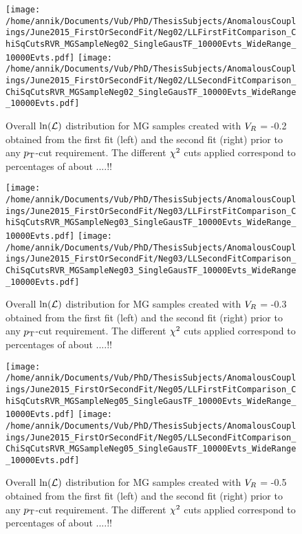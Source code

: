 \begin{figure}[h!t]
 \centering 
 \texttt{[image: /home/annik/Documents/Vub/PhD/ThesisSubjects/AnomalousCouplings/June2015\_FirstOrSecondFit/Neg02/LLFirstFitComparison\_ChiSqCutsRVR\_MGSampleNeg02\_SingleGausTF\_10000Evts\_WideRange\_10000Evts.pdf]}
 \texttt{[image: /home/annik/Documents/Vub/PhD/ThesisSubjects/AnomalousCouplings/June2015\_FirstOrSecondFit/Neg02/LLSecondFitComparison\_ChiSqCutsRVR\_MGSampleNeg02\_SingleGausTF\_10000Evts\_WideRange\_10000Evts.pdf]}
 \caption{Overall $\ln(\mathcal{L})$ distribution for MG samples created with $V_{R}$ = -0.2 obtained from the first fit (left) and the second fit (right) prior to any $p_{\textrm T}$-cut requirement. The different $\chi^{2}$ cuts applied correspond to percentages of about ....!!} 
 \label{fig::FirstVsSecondFitNeg02}
\end{figure}
\begin{figure}[h!t]
 \centering 
 \texttt{[image: /home/annik/Documents/Vub/PhD/ThesisSubjects/AnomalousCouplings/June2015\_FirstOrSecondFit/Neg03/LLFirstFitComparison\_ChiSqCutsRVR\_MGSampleNeg03\_SingleGausTF\_10000Evts\_WideRange\_10000Evts.pdf]}
 \texttt{[image: /home/annik/Documents/Vub/PhD/ThesisSubjects/AnomalousCouplings/June2015\_FirstOrSecondFit/Neg03/LLSecondFitComparison\_ChiSqCutsRVR\_MGSampleNeg03\_SingleGausTF\_10000Evts\_WideRange\_10000Evts.pdf]}
 \caption{Overall $\ln(\mathcal{L})$ distribution for MG samples created with $V_{R}$ = -0.3 obtained from the first fit (left) and the second fit (right) prior to any $p_{\textrm T}$-cut requirement. The different $\chi^{2}$ cuts applied correspond to percentages of about ....!!} 
 \label{fig::FirstVsSecondFitNeg03}
\end{figure}
\begin{figure}[h!t]
 \centering 
 \texttt{[image: /home/annik/Documents/Vub/PhD/ThesisSubjects/AnomalousCouplings/June2015\_FirstOrSecondFit/Neg05/LLFirstFitComparison\_ChiSqCutsRVR\_MGSampleNeg05\_SingleGausTF\_10000Evts\_WideRange\_10000Evts.pdf]}
 \texttt{[image: /home/annik/Documents/Vub/PhD/ThesisSubjects/AnomalousCouplings/June2015\_FirstOrSecondFit/Neg05/LLSecondFitComparison\_ChiSqCutsRVR\_MGSampleNeg05\_SingleGausTF\_10000Evts\_WideRange\_10000Evts.pdf]}
 \caption{Overall $\ln(\mathcal{L})$ distribution for MG samples created with $V_{R}$ = -0.5 obtained from the first fit (left) and the second fit (right) prior to any $p_{\textrm T}$-cut requirement. The different $\chi^{2}$ cuts applied correspond to percentages of about ....!!} 
 \label{fig::FirstVsSecondFitNeg05}
\end{figure}
